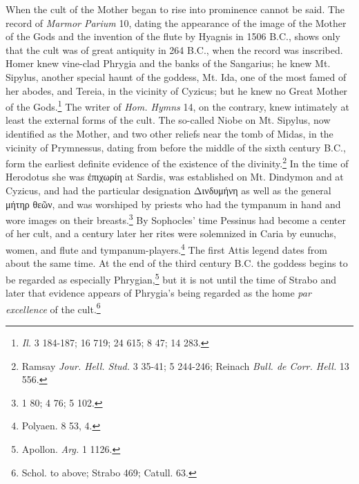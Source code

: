 \documentclass[a4paper, 11pt, oneside, polutonikogreek, english]{article}
\begin{document}
When the cult of the Mother began to rise into prominence cannot be said. The record of \emph{Marmor Parium} 10, dating the appearance of the image of the Mother of the Gods and the invention of the flute by Hyagnis in 1506 \textsc{B.C.}, shows only that the cult was of great antiquity in 264 \textsc{B.C.}, when the record was inscribed. Homer knew vine-clad Phrygia and the banks of the Sangarius; he knew Mt. Sipylus, another special haunt of the goddess, Mt. Ida, one of the most famed of her abodes, and Tereia, in the vicinity of Cyzicus; but he knew no Great Mother of the Gods.\footnote{\emph{Il.} 3 184-187; 16 719; 24 615; 8 47; 14 283.} The writer of \emph{Hom. Hymns} 14, on the contrary, knew intimately at least the external forms of the cult. The so-called Niobe on Mt. Sipylus, now identified as the Mother, and two other reliefs near the tomb of Midas, in the vicinity of Prymnessus, dating from before the middle of the sixth century \textsc{B.C.}, form the earliest definite evidence of the existence of the divinity.\footnote{Ramsay \emph{Jour. Hell. Stud.} 3 35-41; 5 244-246; Reinach \emph{Bull. de Corr. Hell.} 13 556.} In the time of Herodotus she was ἐπιχωρίη at Sardis, was established on Mt. Dindymon and at Cyzicus, and had the particular designation Δινδυμήνη as well as the general μήτηρ θεῶν, and was worshiped by priests who had the tympanum in hand and wore images on their breasts.\footnote{1 80; 4 76; 5 102.} By Sophocles' time Pessinus had become a center of her cult, and a century later her rites were solemnized in Caria by eunuchs, women, and flute and tympanum-players.\footnote{Polyaen. 8 53, 4.} The first Attis legend dates from about the same time. At the end of the third century \textsc{B.C.} the goddess begins to be regarded as especially Phrygian,\footnote{Apollon. \emph{Arg.} 1 1126.} but it is not until the time of Strabo and later that evidence appears of Phrygia's being regarded as the home \emph{par excellence} of the cult.\footnote{Schol. to above; Strabo 469; Catull. 63.}
\end{document}
